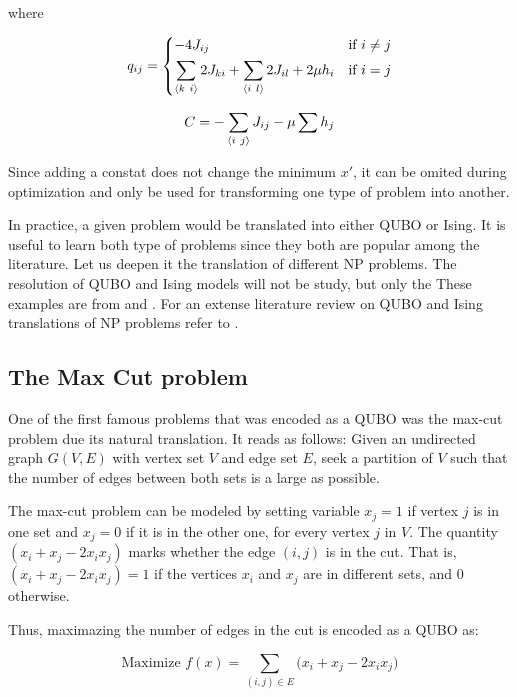 where 

\begin{equation*}
	q_{ij} = 
		\begin{dcases}
			-4 J_{ij} 																	& \text{if } i \neq j \\
			\sum_{\langle k ~ i \rangle} 2 J_{ki} + \sum_{\langle i ~ l \rangle} 2 J_{il} + 2 \mu h_i	& \text{if } i = j
		\end{dcases}
\end{equation*}

$$ C = - \sum_{\langle i ~ j \rangle} J_{ij} - \mu \sum h_j $$

Since adding a constat does not change the minimum $x'$, it can be omited during optimization and only be used for transforming one type of problem into another.

In practice, a given problem would be translated into either QUBO or Ising. It is useful to learn both type of problems since they both are popular among the literature. Let us deepen it the translation of different NP problems. The resolution of QUBO and Ising models will not be study, but only the These examples are from \cite{Glover2019} and \cite{Lucas2014}. For an extense literature review on QUBO and Ising translations of NP problems refer to \cite{Kochenberger2014}.


\subsection{The Max Cut problem}


One of the first famous problems that was encoded as a QUBO was the max-cut problem due its natural translation. It reads as follows: Given an undirected graph $G(V, E)$ with vertex set $V$ and edge set $E$, seek a partition of $V$ such that the number of edges between both sets is a large as possible.

The max-cut problem can be modeled by setting variable $x_j = 1$ if vertex $j$ is in one set and $x_j = 0$ if it is in the other one, for every vertex $j$ in $V$. The quantity $(x_i + x_j - 2 x_i x_j)$ marks whether the edge $(i,j)$ is in the cut. That is, $(x_i + x_j - 2 x_i x_j) = 1$ if the vertices $x_i$ and $x_j$ are in different sets, and $0$ otherwise.

Thus, maximazing the number of edges in the cut is encoded as a QUBO as:

$$ \text{Maximize } f(x) = \sum_{(i,j) \in E} \big( x_i + x_j - 2 x_i x_j \big) $$




